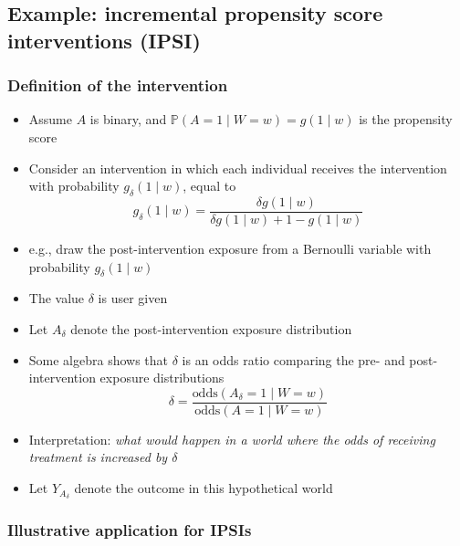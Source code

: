 \documentclass[
  12pt,
]{book}
\providecommand{\tightlist}{%
  \setlength{\itemsep}{0pt}\setlength{\parskip}{0pt}}
\theoremstyle{definition}
\theoremstyle{definition}
\theoremstyle{definition}
\renewcommand{\P}{\mathbb{P}}
\newcommand{\1}{\mathbbm{1}}
\begin{document}
\hypertarget{ipsi}{%
\subsection{\texorpdfstring{Example: incremental propensity score interventions (IPSI) \citep{kennedy2018nonparametric}}{Example: incremental propensity score interventions (IPSI) {[}@kennedy2018nonparametric{]}}}\label{ipsi}}

\hypertarget{definition-of-the-intervention}{%
\subsubsection*{Definition of the intervention}\label{definition-of-the-intervention}}


\begin{itemize}
\tightlist
\item
  Assume \(A\) is binary, and \(\P(A=1\mid W=w) = g(1\mid w)\) is the propensity score
\item
  Consider an intervention in which each individual receives the intervention
  with probability \(g_\delta(1\mid w)\), equal to
  \begin{equation*}
    g_\delta(1\mid w)=\frac{\delta g(1\mid w)}{\delta g(1\mid w) +
    1 - g(1\mid w)}
  \end{equation*}
\item
  e.g., draw the post-intervention exposure from a Bernoulli variable with
  probability \(g_\delta(1\mid w)\)
\item
  The value \(\delta\) is user given
\item
  Let \(A_\delta\) denote the post-intervention exposure distribution
\item
  Some algebra shows that \(\delta\) is an odds ratio comparing the pre- and
  post-intervention exposure distributions
  \begin{equation*}
    \delta = \frac{\text{odds}(A_\delta = 1\mid W=w)}
    {\text{odds}(A = 1\mid W=w)}
  \end{equation*}
\item
  Interpretation: \emph{what would happen in a
  world where the odds of receiving treatment is increased by \(\delta\)}
\item
  Let \(Y_{A_\delta}\) denote the outcome in this hypothetical world
\end{itemize}

\hypertarget{illustrative-application-for-ipsis}{%
\subsubsection{Illustrative application for IPSIs}\label{illustrative-application-for-ipsis}}
\end{document}
